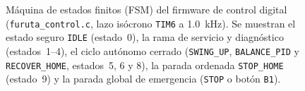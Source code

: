 \begin{figure}[!t]
{\begin{tikzpicture}
\end{tikzpicture}%
}%
\caption{Máquina de estados finitos (FSM) del firmware de control digital (\texttt{furuta\_control.c}, lazo isócrono \texttt{TIM6} a \qty{1.0}{\kilo\hertz}). Se muestran el estado seguro \texttt{IDLE} (estado~0), la rama de servicio y diagnóstico (estados~1--4), el ciclo autónomo cerrado (\texttt{SWING\_UP}, \texttt{BALANCE\_PID} y \texttt{RECOVER\_HOME}, estados~5, 6 y 8), la parada ordenada \texttt{STOP\_HOME} (estado~9) y la parada global de emergencia (\texttt{STOP} o botón \texttt{B1}).}
\label{fig:fsm_firmware}
\end{figure}
